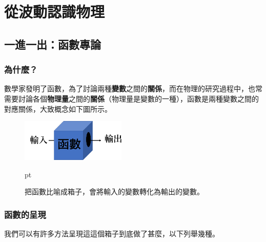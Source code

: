 \chapter{從波動認識物理}

\section{一進一出：函數專論}

\subsection{為什麼？}

數學家發明了函數，為了討論兩種\textbf{變數}之間的\textbf{關係}，而在物理的研究過程中，也常需要討論各個\textbf{物理量}之間的\textbf{關係}（物理量是變數的一種），函數是兩種變數之間的對應關係，大致概念如下圖所示。

\begin{figure}[H]
\centering
\graphicspath{{physics/}}
\includegraphics[width=5cm, center]{blackox.png}
\caption{把函數比喻成箱子，會將輸入的變數轉化為輸出的變數。}  pt
\label{fig:blackbox}
\end{figure}
\subsection{函數的呈現}

我們可以有許多方法呈現這這個箱子到底做了甚麼，以下列舉幾種。

